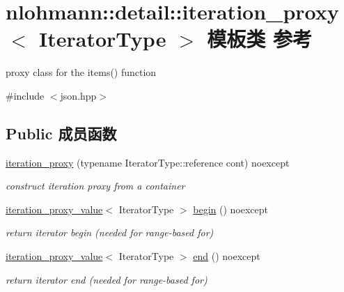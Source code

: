 \hypertarget{classnlohmann_1_1detail_1_1iteration__proxy}{}\section{nlohmann\+::detail\+::iteration\+\_\+proxy$<$ Iterator\+Type $>$ 模板类 参考}
\label{classnlohmann_1_1detail_1_1iteration__proxy}


proxy class for the items() function  




{\ttfamily \#include $<$json.\+hpp$>$}

\subsection*{Public 成员函数}
\begin{DoxyCompactItemize}
\item 
\mbox{\label{classnlohmann_1_1detail_1_1iteration__proxy_afe257e972e3b4658ef2e355f7389d4a5}} 
\mbox{\hyperlink{classnlohmann_1_1detail_1_1iteration__proxy_afe257e972e3b4658ef2e355f7389d4a5}{iteration\+\_\+proxy}} (typename Iterator\+Type\+::reference cont) noexcept
\begin{DoxyCompactList}\small\item\em construct iteration proxy from a container \end{DoxyCompactList}\item 
\mbox{\label{classnlohmann_1_1detail_1_1iteration__proxy_a379f86709d340c4ab1995539b8af623d}} 
\mbox{\hyperlink{classnlohmann_1_1detail_1_1iteration__proxy__value}{iteration\+\_\+proxy\+\_\+value}}$<$ Iterator\+Type $>$ \mbox{\hyperlink{classnlohmann_1_1detail_1_1iteration__proxy_a379f86709d340c4ab1995539b8af623d}{begin}} () noexcept
\begin{DoxyCompactList}\small\item\em return iterator begin (needed for range-\/based for) \end{DoxyCompactList}\item 
\mbox{\label{classnlohmann_1_1detail_1_1iteration__proxy_a90091f8492d23576edef72c5e8b9d4cf}} 
\mbox{\hyperlink{classnlohmann_1_1detail_1_1iteration__proxy__value}{iteration\+\_\+proxy\+\_\+value}}$<$ Iterator\+Type $>$ \mbox{\hyperlink{classnlohmann_1_1detail_1_1iteration__proxy_a90091f8492d23576edef72c5e8b9d4cf}{end}} () noexcept
\begin{DoxyCompactList}\small\item\em return iterator end (needed for range-\/based for) \end{DoxyCompactList}\end{DoxyCompactItemize}


